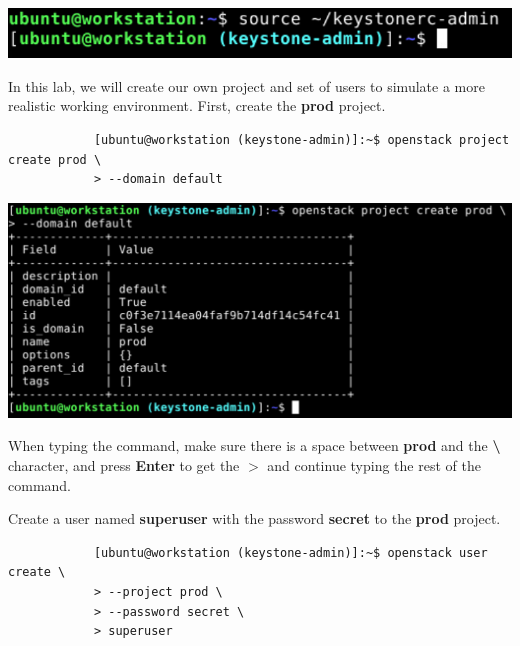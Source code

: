 \documentclass[letterpaper, 12pt]{article}
\begin{document}
\begin{enumerate}
\begin{labstep}
        \begin{center}
            \includegraphics[width=\linewidth]{images/part1/step3.png}
        \end{center}
    \end{labstep}

    \begin{labstep}
        In this lab, we will create our own project and set of users to simulate a more realistic working environment.
        First, create the \textbf{prod} project.
        \begin{lstlisting}
            [ubuntu@workstation (keystone-admin)]:~$ openstack project create prod \
            > --domain default
        \end{lstlisting}

        \begin{center}
            \includegraphics[width=\linewidth]{images/part1/step4.png}
        \end{center}
    \end{labstep}

    \begin{tipbox}
        When typing the command, make sure there is a space between \textbf{prod} and the \textbf{\textbackslash} character, and press \textbf{Enter} to get the \textbf{$>$} and continue typing the rest of the command.
    \end{tipbox}

    \begin{labstep}
        Create a user named \textbf{superuser} with the password \textbf{secret} to the \textbf{prod} project.
        \begin{lstlisting}
            [ubuntu@workstation (keystone-admin)]:~$ openstack user create \
            > --project prod \
            > --password secret \
            > superuser
        \end{lstlisting}


\end{labstep}
\end{enumerate}
\end{document}
